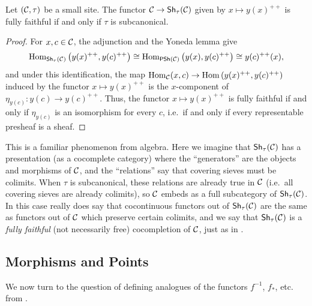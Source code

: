 \begin{proposition}\label{prop:chap:sheaves:sec:sites:subcanonical iff fully faithful}
    Let $(\mathcal{C},\tau)$ be a small site. The functor $\mathcal{C} \to \mathsf{Sh}_{\tau}(\mathcal{C})$ given by $x \mapsto y(x)^{++}$ is fully faithful if and only if $\tau$ is subcanonical.
\end{proposition}
\begin{proof}
    For $x, c \in \mathcal{C}$, the adjunction and the Yoneda lemma give
    \[\operatorname{Hom}_{\mathsf{Sh}_{\tau}(\mathcal{C})}\left(y(x)^{++}, y(c)^{++}\right) \cong \operatorname{Hom}_{\mathsf{PSh}(\mathcal{C})}\left(y(x), y(c)^{++}\right) \cong y(c)^{++}(x),\]
    and under this identification, the map $\operatorname{Hom}_{\mathcal{C}}(x,c) \to \operatorname{Hom}\left(y(x)^{++},y(c)^{++}\right)$ induced by the functor $x \mapsto y(x)^{++}$ is the $x$-component of $\eta_{y(c)} : y(c) \to y(c)^{++}$. Thus, the functor $x \mapsto y(x)^{++}$ is fully faithful if and only if $\eta_{y(c)}$ is an isomorphism for every $c$, i.e.\ if and only if every representable presheaf is a sheaf.
\end{proof}

This is a familiar phenomenon from algebra. Here we imagine that $\mathsf{Sh}_{\tau}(\mathcal{C})$ has a presentation (as a cocomplete category) where the ``generators'' are the objects and morphisms of $\mathcal{C}$, and the ``relations'' say that covering sieves must be colimits. When $\tau$ is subcanonical, these relations are already true in $\mathcal{C}$ (i.e.\ all covering sieves are already colimits), so $\mathcal{C}$ embeds as a full subcategory of $\mathsf{Sh}_{\tau}(\mathcal{C})$. In this case  really does say that cocontinuous functors out of $\mathsf{Sh}_{\tau}(\mathcal{C})$ are the same as functors out of $\mathcal{C}$ which preserve certain colimits, and we say that $\mathsf{Sh}_{\tau}(\mathcal{C})$ is a \emph{fully faithful} (not necessarily free) cocompletion of $\mathcal{C}$, just as in .

\subsection{Morphisms and Points}

We now turn to the question of defining analogues of the functors $f^{-1}$, $f_*$, etc. from .


